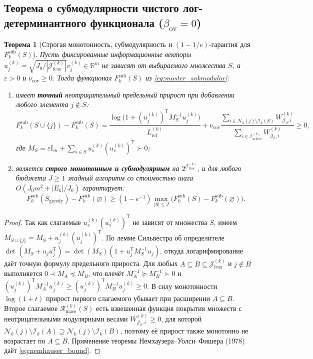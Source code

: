 \documentclass[11pt,a4paper]{article}
\newcommand{\R}{\mathbb{R}}
\newcommand{\Id}{\mathrm{I}}
\newcommand{\T}{^{\mathsf{T}}}
\newcommand{\II}{\mathcal{I}}
\newcommand{\JJJ}{\mathcal{J}}
\newtheorem{theorem}{Теорема}[section]
\theoremstyle{definition}
\theoremstyle{remark}
\begin{document}
\subsection{Теорема о субмодулярности чистого лог-детерминантного функционала ($\beta_{\mathrm{ov}} = 0$)}

\begin{theorem}[Строгая монотонность, субмодулярность и $(1 - 1/e)$-гарантия для $F_k^{\mathrm{sub}}(S)$]\label{thm:submodular_d_opt}
Пусть фиксированные информационные векторы $u_j^{(k)} = \sqrt{J_0 / |\JJJ_{\mathrm{feas}}^{(k)}|} v_j^{(k)} \in \R^m$ не зависят от выбираемого множества $S$, а $\varepsilon > 0$ и $\nu_{\mathrm{cov}} \ge 0$. Тогда функционал $F_k^{\mathrm{sub}}(S)$ из \eqref{eq:master_submodular}:
\begin{enumerate}
    \item имеет \textbf{точный} неотрицательный предельный прирост при добавлении любого элемента $j \notin S$:
    \[
        F_k^{\mathrm{sub}}(S \cup \{j\}) - F_k^{\mathrm{sub}}(S) = \frac{\log\bigl(1 + (u_j^{(k)})\T M_S^{-1} u_j^{(k)}\bigr)}{L_{\mathrm{ref}}^{(k)}} + \nu_{\mathrm{cov}}\frac{\sum_{i \in \mathcal{N}_k(j) \setminus \II_k(S)} W_{\JJJ_0, i}^{(k)}}{\sum_{i \in \II_{\mathrm{active}}^{(k)}} W_{\JJJ_0, i}^{(k)}} \ge 0,
    \]
    где $M_S = \varepsilon \Id_m + \sum_{s \in S} u_s^{(k)}(u_s^{(k)})\T \succ 0$;
    \item является \textbf{строго монотонным и субмодулярным} на $2^{\JJJ_{\mathrm{feas}}^{(k)}}$, и для любого бюджета $J \ge 1$ жадный алгоритм со стоимостью шага $O(J_0 m^2 + |E_k|/J_0)$ гарантирует:
    \begin{equation}\label{eq:nemhauser_bound}
        F_k^{\mathrm{sub}}(S_{\mathrm{greedy}}) - F_k^{\mathrm{sub}}(\varnothing) \ge \left(1 - e^{-1}\right) \max_{|S| \le J}\bigl(F_k^{\mathrm{sub}}(S) - F_k^{\mathrm{sub}}(\varnothing)\bigr).
    \end{equation}
\end{enumerate}
\end{theorem}
\begin{proof}
Так как слагаемые $u_s^{(k)}(u_s^{(k)})\T$ не зависят от множества $S$, имеем $M_{S \cup \{j\}} = M_S + u_j^{(k)}(u_j^{(k)})\T$. По лемме Сильвестра об определителе $\det(M_S + u_j u_j\T) = \det(M_S)(1 + u_j\T M_S^{-1} u_j)$, откуда логарифмирование даёт точную формулу предельного прироста. Для любых $A \subseteq B \subseteq \JJJ_{\mathrm{feas}}^{(k)}$ и $j \notin B$ выполняется $0 \prec M_A \preceq M_B$, что влечёт $M_A^{-1} \succeq M_B^{-1} \succ 0$ и $(u_j^{(k)})\T M_A^{-1} u_j^{(k)} \ge (u_j^{(k)})\T M_B^{-1} u_j^{(k)} \ge 0$. В силу монотонности $\log(1+t)$ прирост первого слагаемого убывает при расширении $A \subseteq B$. Второе слагаемое $\mathcal{R}_{\mathrm{mass}}^{(k)}(S)$ есть взвешенная функция покрытия множеств с неотрицательными модулярными весами $W_{\JJJ_0, i}^{(k)} \ge 0$, для которой $\mathcal{N}_k(j)\setminus \II_k(A) \supseteq \mathcal{N}_k(j)\setminus \II_k(B)$, поэтому её прирост также монотонно не возрастает по $A \subseteq B$. Применение теоремы Немхаузера--Уолси--Фишера (1978) даёт \eqref{eq:nemhauser_bound}.
\end{proof}
\end{document}
